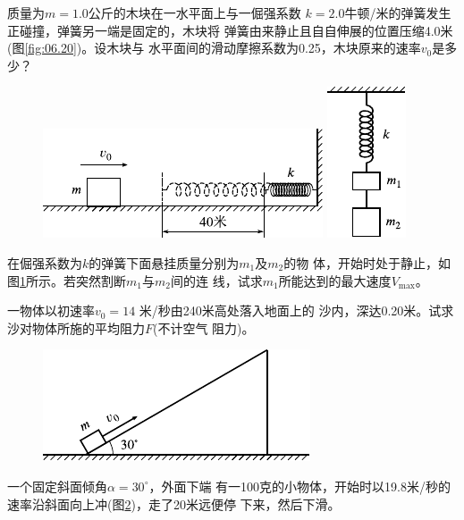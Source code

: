 \begin{exercises}
\exercise 质量为$ m = 1.0 $公斤的木块在一水平面上与一倔强系数
$ k = 2.0 $牛顿/米的弹簧发生正碰撞，弹簧另一端是固定的，木块将
弹簧由来静止且自自伸展的位置压缩4.0米(图\ref{fig:06.20})。设木块与
水平面间的滑动摩擦系数为0.25，木块原来的速率$ v _ { 0 } $是多少？
\begin{figure}[h]
  \begin{minipage}[b]{0.7\linewidth}
    \centering
    \includegraphics{figure/fig06.20}
    \caption{}
    \label{fig:06.20}
  \end{minipage}
  \hfill
  \begin{minipage}[b]{0.25\linewidth}
    \centering
    \includegraphics{figure/fig06.21}
    \caption{}
    \label{fig:06.21}
  \end{minipage}
\end{figure}

\exercise 在倔强系数为$ k $的弹簧下面悬挂质量分别为$ m_1 $及$ m_2 $的物
体，开始时处于静止，如图\ref{fig:06.21}\;所示。若突然割断$ m _ { 1 } $与$ m_2 $间的连
线，试求$ m _ { 1 } $所能达到的最大速度$ V_{\max} $。

\exercise 一物体以初速率$ v _ { 0 } = 14 $ 米/秒由240米高处落入地面上的
沙内，深达0.20米。试求沙对物体所施的平均阻力$ F $(不计空气
阻力)。

\begin{figure}
  \centering
  \includegraphics{figure/fig06.22}
  \caption{}
  \label{fig:06.22}
\end{figure}
\exercise 一个固定斜面倾角$ \alpha = 30 ^ { \circ } $，外面下端
有一100克的小物体，开始时以19.8米/秒的
速率沿斜面向上冲(图\ref{fig:06.22})，走了20米远便停
下来，然后下滑。


\end{exercises}

